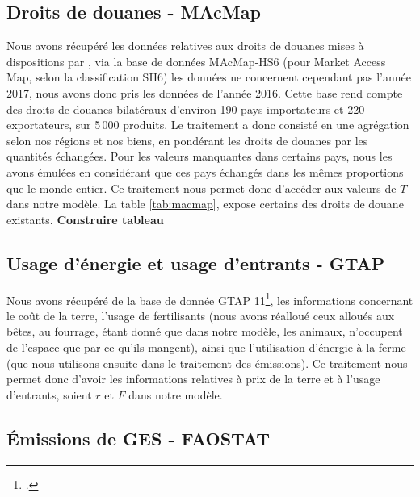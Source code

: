 \subsection{Droits de douanes - MAcMap}

Nous avons récupéré les données relatives aux droits de douanes mises à dispositions par \cite{Guimbard2012}, via la base de données MAcMap-HS6 (pour Market Access Map, selon la classification SH6) les données ne concernent cependant pas l'année 2017, nous avons donc pris les données de l'année 2016. Cette base rend compte des droits de douanes bilatéraux d'environ 190 pays importateurs et 220 exportateurs, sur 5\,000 produits. Le traitement a donc consisté en une agrégation selon nos régions et nos biens, en pondérant les droits de douanes par les quantités échangées. Pour les valeurs manquantes dans certains pays, nous les avons émulées en considérant que ces pays échangés dans les mêmes proportions que le monde entier. Ce traitement nous permet donc d'accéder aux valeurs de $T$ dans notre modèle. La table \ref{tab:macmap}, expose certains des droits de douane existants. \textbf{Construire tableau}


\subsection{Usage d'énergie et usage d'entrants - GTAP}

Nous avons récupéré de la base de donnée GTAP 11\footcite{Aguiar2022}, les informations concernant le coût de la terre, l'usage de fertilisants (nous avons réalloué ceux alloués aux bêtes, au fourrage, étant donné que dans notre modèle, les animaux, n'occupent de l'espace que par ce qu'ils mangent), ainsi que l'utilisation d'énergie à la ferme (que nous utilisons ensuite dans le traitement des émissions). Ce traitement nous permet donc d'avoir les informations relatives à prix de la terre et à l'usage d'entrants, soient $r$ et $F$ dans notre modèle.


\subsection{Émissions de GES - FAOSTAT}

